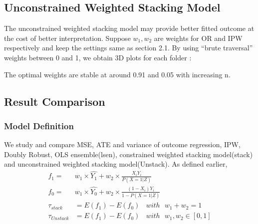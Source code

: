\documentclass{elegantpaper}
\begin{document}
\subsection{Unconstrained Weighted Stacking Model}
The unconstrained weighted stacking model may provide better fitted outcome at the cost of  better interpretation. Suppose $w_1, w_2$ are weights for OR and IPW respectively and keep the settings same as section 2.1. By using “brute traversal” weights between 0 and 1, we obtain 3D plots for each folder :
\begin{figure}[H]
\setlength{\abovecaptionskip}{0.cm}
\setlength{\belowcaptionskip}{0.cm}
%
%
\end{figure}
\begin{figure}[H]
%
\end{figure}
The optimal weights are stable at around 0.91 and 0.05 with increasing n.
\smallskip

\subsection{Result Comparison}
\subsubsection{Model Definition}
We study and compare MSE, ATE and variance of outcome regression, IPW, Doubly Robust, OLS ensemble(lsen), constrained weighted stacking model(stack) and unconstrained weighted stacking model(Unstack). As defined earlier, 
\begin{equation}
\begin{split}
f_{1}=&w_1 \times \widehat{Y_1}  + w_2 \times \frac{X_{i} Y_{i}}{P(X=1 | Z)}\\
f_{0}=&w_1 \times \widehat{Y_0}  + w_2 \times \frac{\left(1-X_{i}\right) Y_{i}}{1-P(X=1 | Z)}\\
\tau_{stack} &=  E(f_{1}) - E(f_{0}) \ \ \ \ with \ \ \ w_1 + w_2 = 1\\
\tau_{Unstack} &=  E(f_{1}) - E(f_{0}) \ \ \ \ with \ \ \  w_1,w_2 \in [0,1]
\end{split}
\end{equation}
\end{document}
